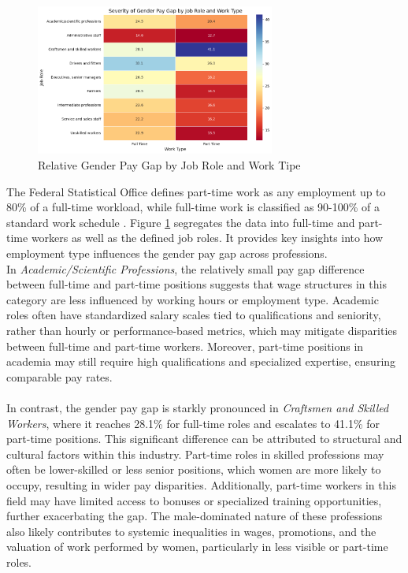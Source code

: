 \documentclass{article}
\begin{document}
\begin{figure}[h]
    \centering
    \includegraphics[width=0.7\textwidth]{Figures/Severity_of_Pay_Gap_by_Role_and_Work_Type.png}
    \caption{Relative Gender Pay Gap by Job Role and Work Tipe}
    \label{fig:heatmap}
\end{figure}

The Federal Statistical Office defines part-time work as any employment up to 80\% of a full-time workload, while full-time work is classified as 90-100\% of a standard work schedule \cite{2}. Figure \ref{fig:heatmap} segregates the data into full-time and part-time workers as well as the defined job roles.  It provides key insights into how employment type influences the gender pay gap across professions. \\
In \textit{Academic/Scientific Professions}, the relatively small pay gap difference between full-time and part-time positions suggests that wage structures in this category are less influenced by working hours or employment type. Academic roles often have standardized salary scales tied to qualifications and seniority, rather than hourly or performance-based metrics, which may mitigate disparities between full-time and part-time workers. Moreover, part-time positions in academia may still require high qualifications and specialized expertise, ensuring comparable pay rates. \\
\\
In contrast, the gender pay gap is starkly pronounced in \textit{Craftsmen and Skilled Workers}, where it reaches 28.1\% for full-time roles and escalates to 41.1\% for part-time positions. This significant difference can be attributed to structural and cultural factors within this industry. Part-time roles in skilled professions may often be lower-skilled or less senior positions, which women are more likely to occupy, resulting in wider pay disparities. Additionally, part-time workers in this field may have limited access to bonuses or specialized training opportunities, further exacerbating the gap. The male-dominated nature of these professions also likely contributes to systemic inequalities in wages, promotions, and the valuation of work performed by women, particularly in less visible or part-time roles.\\
\end{document}
